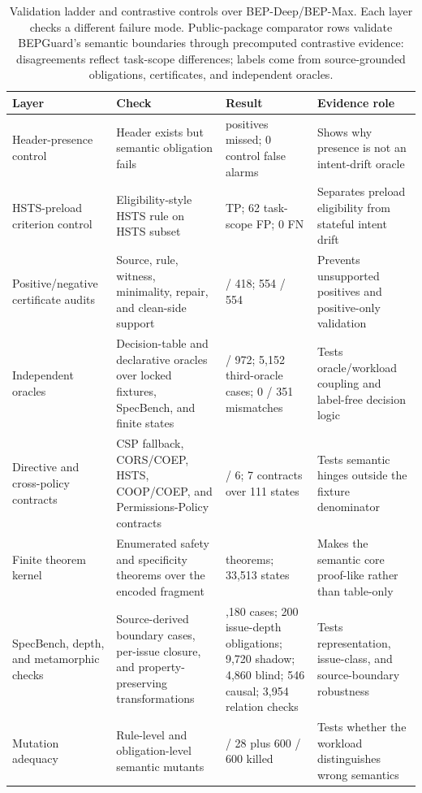 \begin{table}[t]
\centering
\footnotesize
\caption{Validation ladder and contrastive controls over BEP-Deep/BEP-Max. Each layer checks a different failure mode. Public-package comparator rows validate BEPGuard's semantic boundaries through precomputed contrastive evidence: disagreements reflect task-scope differences; labels come from source-grounded obligations, certificates, and independent oracles.}
\label{tab:baseline}
\begin{tabular}{>{\raggedright\arraybackslash}p{}>{\raggedright\arraybackslash}p{}>{\raggedright\arraybackslash}p{}>{\raggedright\arraybackslash}p{}}
\toprule
Layer & Check & Result & Evidence role \\
\midrule
Header-presence control & Header exists but semantic obligation fails & 322 positives missed; 0 control false alarms & Shows why presence is not an intent-drift oracle \\
HSTS-preload criterion control & Eligibility-style HSTS rule on HSTS subset & 54 TP; 62 task-scope FP; 0 FN & Separates preload eligibility from stateful intent drift \\
Positive/negative certificate audits & Source, rule, witness, minimality, repair, and clean-side support & 418 / 418; 554 / 554 & Prevents unsupported positives and positive-only validation \\
Independent oracles & Decision-table and declarative oracles over locked fixtures, SpecBench, and finite states & 972 / 972; 5,152 third-oracle cases; 0 / 351 mismatches & Tests oracle/workload coupling and label-free decision logic \\
Directive and cross-policy contracts & CSP fallback, CORS/COEP, HSTS, COOP/COEP, and Permissions-Policy contracts & 6 / 6; 7 contracts over 111 states & Tests semantic hinges outside the fixture denominator \\
Finite theorem kernel & Enumerated safety and specificity theorems over the encoded fragment & 30 theorems; 33,513 states & Makes the semantic core proof-like rather than table-only \\
SpecBench, depth, and metamorphic checks & Source-derived boundary cases, per-issue closure, and property-preserving transformations & 4,180 cases; 200 issue-depth obligations; 9,720 shadow; 4,860 blind; 546 causal; 3,954 relation checks & Tests representation, issue-class, and source-boundary robustness \\
Mutation adequacy & Rule-level and obligation-level semantic mutants & 28 / 28 plus 600 / 600 killed & Tests whether the workload distinguishes wrong semantics \\

\end{tabular}
\end{table}
